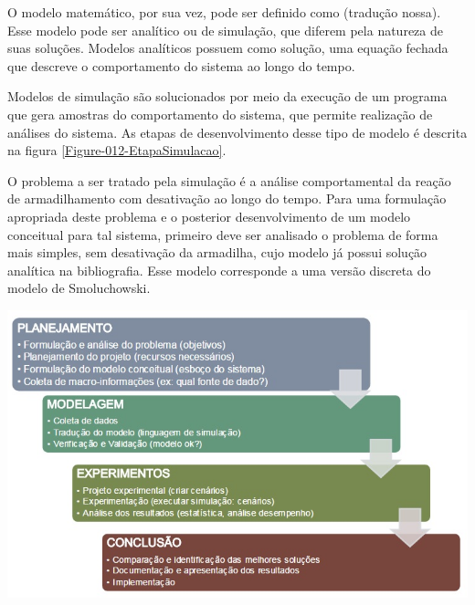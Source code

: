 O modelo matemático, por sua vez, pode ser definido como \cite{2} (tradução nossa). Esse modelo pode ser analítico ou de simulação,
que diferem pela natureza de suas soluções. Modelos analíticos possuem como
solução, uma equação fechada que descreve o comportamento do sistema ao longo do
tempo\cite{1}.

Modelos de simulação são solucionados por meio da execução de um programa que
gera amostras do comportamento do sistema, que permite realização de análises
do sistema\cite{1}. As etapas de desenvolvimento desse tipo de modelo é
descrita na figura \ref{Figure-012-EtapaSimulacao}.

O problema a ser tratado pela simulação é a análise comportamental da reação de
armadilhamento com desativação ao longo do tempo. Para uma formulação apropriada
deste problema e o posterior desenvolvimento de um modelo conceitual para tal
sistema, primeiro deve ser analisado o problema de forma mais simples, sem
desativação da armadilha, cujo modelo já possui solução analítica na
bibliografia. Esse modelo corresponde a uma versão discreta do modelo de
Smoluchowski\cite{5}.

{ \centering
	\hfill \break
	\captionsetup{type=figure}
	\includegraphics[width=\columnwidth]{./figures/012-EtapaSimulacao.jpg}
	\label{Figure-012-EtapaSimulacao}
}
